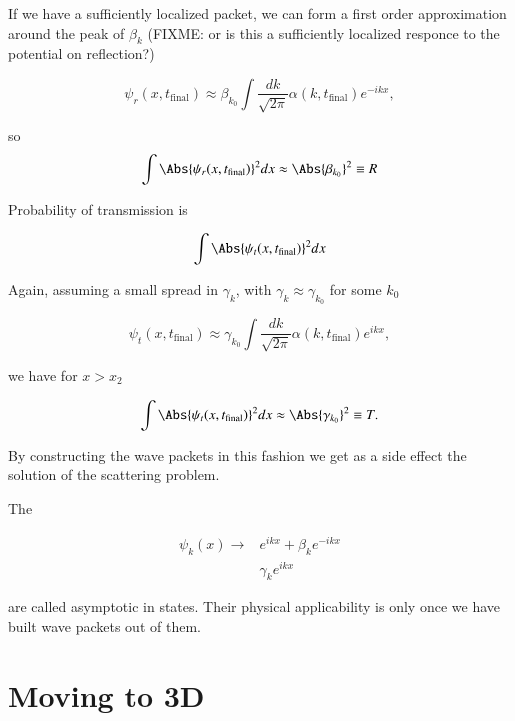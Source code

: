 If we have a sufficiently localized packet, we can form a first order approximation around the peak of $\beta_k$ (FIXME: or is this a sufficiently localized responce to the potential on reflection?)

\begin{equation}\label{eqn:qmTwoL22:410}
\psi_r(x, t_{\text{final}}) \approx \beta_{k_0}
\int \frac{dk}{\sqrt{2 \pi}} \alpha(k, t_{\text{final}}) e^{-i k x},
\end{equation}

so
\begin{equation}\label{eqn:qmTwoL22:430}
\int \Abs{\psi_r(x, t_{\text{final}})}^2 dx
\approx \Abs{\beta_{k_0}}^2 \equiv R
\end{equation}

Probability of transmission is

\begin{equation}\label{eqn:qmTwoL22:450}
\int \Abs{\psi_t(x, t_{\text{final}})}^2 dx
\end{equation}

Again, assuming a small spread in $\gamma_k$, with $\gamma_k \approx \gamma_{k_0}$ for some $k_0$

\begin{equation}\label{eqn:qmTwoL22:470}
\psi_t(x, t_{\text{final}}) \approx \gamma_{k_0}
\int \frac{dk}{\sqrt{2 \pi}} \alpha(k, t_{\text{final}}) e^{i k x},
\end{equation}

we have for $x > x_2$

\begin{equation}\label{eqn:qmTwoL22:490}
\int \Abs{\psi_t(x, t_{\text{final}})}^2 dx
\approx \Abs{\gamma_{k_0}}^2 \equiv T.
\end{equation}

By constructing the wave packets in this fashion we get as a side effect the solution of the scattering problem.

The

\begin{align*}
\psi_k(x) \rightarrow & e^{i k x} + \beta_k e^{-i k x} \\
& \gamma_k e^{i k x}
\end{align*}

are called asymptotic in states.  Their physical applicability is only once we have built wave packets out of them.

\section{Moving to 3D}

